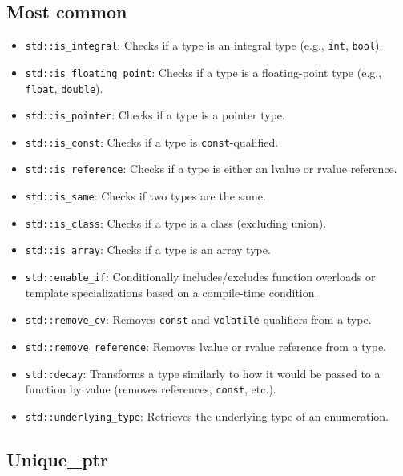 \documentclass{report}
\begin{document}
        \subsection{Most common}
        \begin{itemize}
            \item \texttt{std::is\_integral}: Checks if a type is an integral type (e.g., \texttt{int}, \texttt{bool}).
            \item \texttt{std::is\_floating\_point}: Checks if a type is a floating-point type (e.g., \texttt{float}, \texttt{double}).
            \item \texttt{std::is\_pointer}: Checks if a type is a pointer type.
            \item \texttt{std::is\_const}: Checks if a type is \texttt{const}-qualified.
            \item \texttt{std::is\_reference}: Checks if a type is either an lvalue or rvalue reference.
            \item \texttt{std::is\_same}: Checks if two types are the same.
            \item \texttt{std::is\_class}: Checks if a type is a class (excluding union).
            \item \texttt{std::is\_array}: Checks if a type is an array type.
            \item \texttt{std::enable\_if}: Conditionally includes/excludes function overloads or template specializations based on a compile-time condition.
            \item \texttt{std::remove\_cv}: Removes \texttt{const} and \texttt{volatile} qualifiers from a type.
            \item \texttt{std::remove\_reference}: Removes lvalue or rvalue reference from a type.
            \item \texttt{std::decay}: Transforms a type similarly to how it would be passed to a function by value (removes references, \texttt{const}, etc.).
            \item \texttt{std::underlying\_type}: Retrieves the underlying type of an enumeration.
        \end{itemize}

        \pagebreak 
        \bigbreak \noindent 
        \subsection{Unique\_ptr}
        \bigbreak \noindent 
\end{document}
